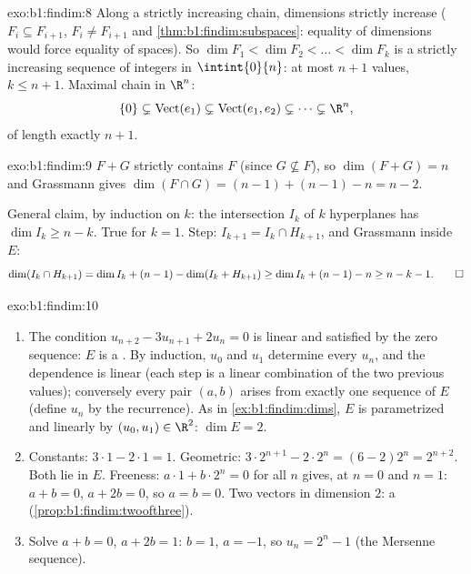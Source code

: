\begin{solution}{exo:b1:findim:8}
Along a strictly increasing chain, dimensions strictly increase
($F_i \subseteq F_{i+1}$, $F_i \neq F_{i+1}$ and
\cref{thm:b1:findim:subspaces}: equality of dimensions would force
equality of spaces). So $\dim F_1 < \dim F_2 < \dots < \dim F_k$ is
a strictly increasing sequence of integers in $\intint{0}{n}$: at
most $n + 1$ values, $k \leq n + 1$. Maximal chain in $\R^n$:
\[
\{0\} \subsetneq \operatorname{Vect}(e_1) \subsetneq
\operatorname{Vect}(e_1, e_2) \subsetneq \dots \subsetneq \R^n ,
\]
of length exactly $n + 1$.
\end{solution}

\begin{solution}{exo:b1:findim:9}
$F + G$ strictly contains $F$ (since $G \not\subseteq F$), so
$\dim(F + G) = n$ and Grassmann gives $\dim(F \cap G) = (n-1) +
(n-1) - n = n - 2$.

General claim, by induction on $k$: the intersection $I_k$ of $k$
hyperplanes has $\dim I_k \geq n - k$. True for $k = 1$. Step: $I_{k+1}
= I_k \cap H_{k+1}$, and Grassmann inside $E$:
\[
\dim(I_k \cap H_{k+1}) = \dim I_k + (n - 1) - \dim(I_k + H_{k+1})
\geq \dim I_k + (n-1) - n \geq n - k - 1 . \qedhere
\]
\end{solution}

\begin{solution}{exo:b1:findim:10}
\begin{enumerate}
  \item The condition $u_{n+2} - 3u_{n+1} + 2u_n = 0$ is linear
        and satisfied by the zero sequence: $E$ is a . By
        induction, $u_0$ and $u_1$ determine every $u_n$, and the
        dependence is linear (each step is a linear combination of
        the two previous values); conversely every pair $(a, b)$
        arises from exactly one sequence of $E$ (define $u_n$ by
        the recurrence). As in \cref{ex:b1:findim:dims}, $E$ is
        parametrized  and linearly by $(u_0, u_1) \in
        \R^2$: $\dim E = 2$.
  \item Constants: $3\cdot1 - 2\cdot1 = 1$. Geometric: $3\cdot
        2^{n+1} - 2\cdot 2^n = (6 - 2)2^n = 2^{n+2}$. Both lie in
        $E$. Freeness: $a\cdot 1 + b\cdot 2^n = 0$ for all $n$
        gives, at $n = 0$ and $n = 1$: $a + b = 0$, $a + 2b = 0$,
        so $a = b = 0$. Two  vectors in dimension $2$: a 
        (\cref{prop:b1:findim:twoofthree}).
  \item Solve $a + b = 0$, $a + 2b = 1$: $b = 1$, $a = -1$, so
        $u_n = 2^n - 1$ (the Mersenne sequence).
\end{enumerate}
\end{solution}

